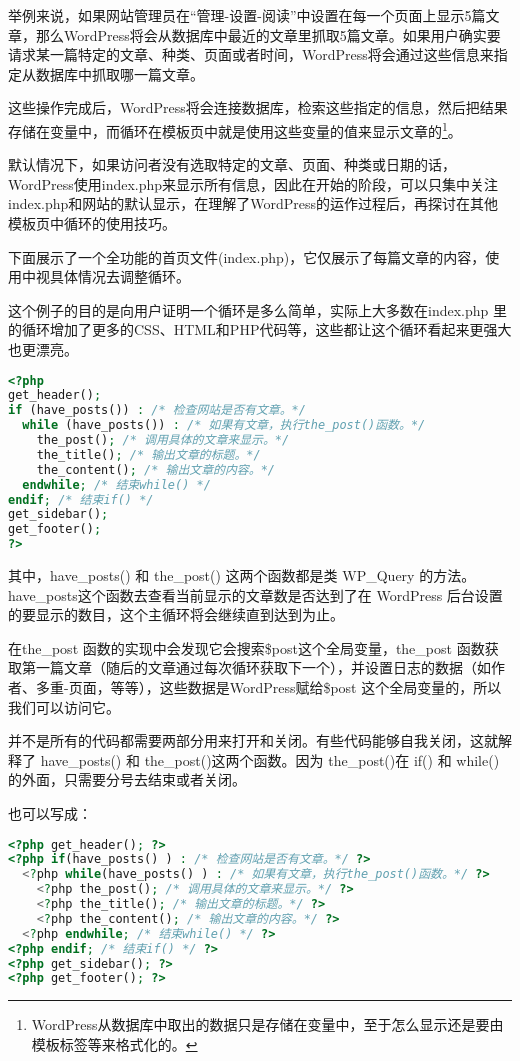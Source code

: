 举例来说，如果网站管理员在“管理-设置-阅读”中设置在每一个页面上显示5篇文章，那么WordPress将会从数据库中最近的文章里抓取5篇文章。如果用户确实要请求某一篇特定的文章、种类、页面或者时间，WordPress将会通过这些信息来指定从数据库中抓取哪一篇文章。

这些操作完成后，WordPress将会连接数据库，检索这些指定的信息，然后把结果存储在变量中，而循环在模板页中就是使用这些变量的值来显示文章的\footnote{WordPress从数据库中取出的数据只是存储在变量中，至于怎么显示还是要由模板标签等来格式化的。}。

默认情况下，如果访问者没有选取特定的文章、页面、种类或日期的话，WordPress使用index.php来显示所有信息，因此在开始的阶段，可以只集中关注index.php和网站的默认显示，在理解了WordPress的运作过程后，再探讨在其他模板页中循环的使用技巧。


下面展示了一个全功能的首页文件(index.php)，它仅展示了每篇文章的内容，使用中视具体情况去调整循环。 

这个例子的目的是向用户证明一个循环是多么简单，实际上大多数在index.php 里的循环增加了更多的CSS、HTML和PHP代码等，这些都让这个循环看起来更强大也更漂亮。

\begin{lstlisting}[language=PHP]
<?php
get_header();
if (have_posts()) : /* 检查网站是否有文章。*/
  while (have_posts()) : /* 如果有文章，执行the_post()函数。*/
    the_post(); /* 调用具体的文章来显示。*/
    the_title(); /* 输出文章的标题。*/
    the_content(); /* 输出文章的内容。*/
  endwhile; /* 结束while() */
endif; /* 结束if() */
get_sidebar();
get_footer(); 
?>
\end{lstlisting}


其中，have\_posts() 和 the\_post() 这两个函数都是类 WP\_Query 的方法。have\_posts这个函数去查看当前显示的文章数是否达到了在 WordPress 后台设置的要显示的数目，这个主循环将会继续直到达到为止。

在the\_post 函数的实现中会发现它会搜索\$post这个全局变量，the\_post 函数获取第一篇文章（随后的文章通过每次循环获取下一个），并设置日志的数据（如作者、多重-页面，等等），这些数据是WordPress赋给\$post 这个全局变量的，所以我们可以访问它。

并不是所有的代码都需要两部分用来打开和关闭。有些代码能够自我关闭，这就解释了 have\_posts() 和 the\_post()这两个函数。因为 the\_post()在 if() 和 while() 的外面，只需要分号去结束或者关闭。

也可以写成：


\begin{lstlisting}[language=PHP]
<?php get_header(); ?>
<?php if(have_posts() ) : /* 检查网站是否有文章。*/ ?> 
  <?php while(have_posts() ) : /* 如果有文章，执行the_post()函数。*/ ?>
    <?php the_post(); /* 调用具体的文章来显示。*/ ?>
    <?php the_title(); /* 输出文章的标题。*/ ?>
    <?php the_content(); /* 输出文章的内容。*/ ?>
  <?php endwhile; /* 结束while() */ ?>
<?php endif; /* 结束if() */ ?>
<?php get_sidebar(); ?>
<?php get_footer(); ?>
\end{lstlisting}


